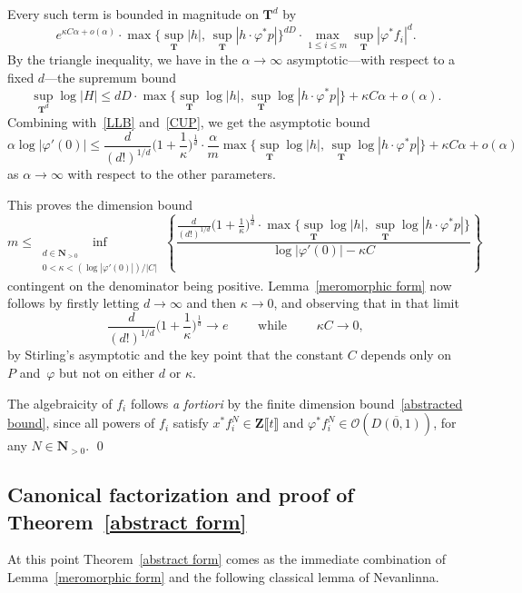 \documentclass[10pt]{amsart}
\def\NwithoutzeroA{\mathbf{N}_{> 0}}
\def\T{\mathbf{T}}
\def\Z{\mathbf{Z}}
\theoremstyle{remark}
\numberwithin{equation}{subsection}
\begin{document}
Every such term is bounded in magnitude on $\T^d$ by
$$
e^{\kappa C \alpha + o(\alpha)} \cdot \max\big\{ \sup_{\T} |h|, \, \sup_{\T} |h \cdot \varphi^*p| \big\}^{dD} \cdot \max_{1 \leq i \leq m} \sup_{\T} |\varphi^* f_i|^d. 
$$
By the triangle inequality, we have in the $\alpha \to \infty$ asymptotic---with respect to a fixed $d$---the supremum bound
\begin{equation*}
\sup_{\T^d} \log{|H|}    \leq  dD  \cdot \max\big\{ \sup_{\T} \log{|h|}, \, \sup_{\T} \log{|h \cdot \varphi^*p|} \big\} + \kappa C \alpha + o(\alpha).
\end{equation*}
Combining with~\eqref{LLB} and~\eqref{CUP}, we get the asymptotic bound
$$
\alpha \log{|\varphi'(0)|}  \leq  \frac{d}{(d!)^{1/d}} \Big( 1 + \frac{1}{\kappa} \Big)^{\frac{1}{d}} \cdot \frac{\alpha}{m}   \max\big\{ \sup_{\T} \log{|h|}, \, \sup_{\T} \log{|h \cdot \varphi^*p|} \big\} + \kappa C \alpha +  o(\alpha)
$$
as $\alpha \to \infty$ with respect to the other parameters. 

This proves  the dimension bound
$$
m \leq  \inf_{ \substack{  d \in \NwithoutzeroA  \\ 0 < \kappa < (\log{|\varphi'(0)|})/|C| }  } \left\{  \frac{ \frac{d}{(d!)^{1/d}} \Big( 1 + \frac{1}{\kappa} \Big)^{\frac{1}{d}} \cdot  \max\big\{ \sup_{\T} \log{|h|}, \, \sup_{\T} \log{|h \cdot \varphi^*p|} \big\}}{{\log{|\varphi'(0)| - \kappa C}} }   \right\}
$$
contingent on the denominator being positive.
Lemma~\ref{meromorphic form} now follows by firstly letting $d \to \infty$ and then $\kappa \to 0$, and observing that in that limit
$$
  \frac{d}{(d!)^{1/d}} \Big( 1 + \frac{1}{\kappa} \Big)^{\frac{1}{d}} \to e \qquad \textrm{ while } \qquad \kappa C \to 0,
$$
by Stirling's asymptotic and the key point that the constant $C$ depends only 
on~$P$ and~$\varphi$  but not on either $d$ or $\kappa$.  
 
 
 The algebraicity of $f_i$ follows {\it a fortiori} 
 by the finite dimension bound~\eqref{abstracted bound},  since all powers of $f_i$ satisfy $x^*f_i^N\in \Z\llbracket t \rrbracket$ and $\varphi^*f_i^N \in \mathcal{O}(\overline{D(0,1)})$, for any $N\in \NwithoutzeroA$.   \qed

\subsection{Canonical factorization and proof of Theorem~\ref{abstract form}} \label{canonical decomposition}
At this point Theorem~\ref{abstract form} comes as the immediate combination of Lemma~\ref{meromorphic form} and the following classical lemma of Nevanlinna. 
\end{document}
